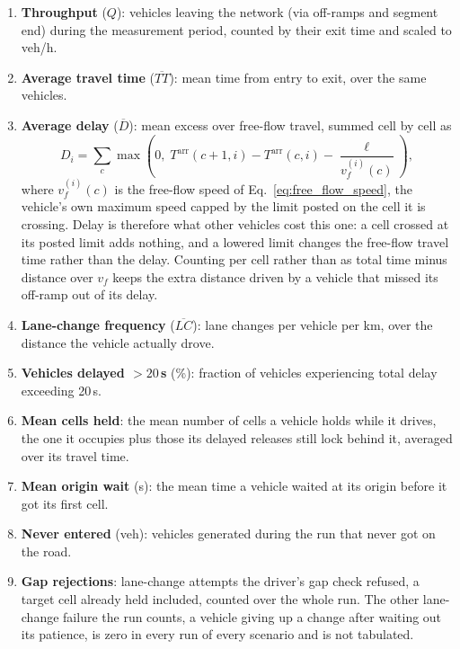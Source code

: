 \documentclass[review,authoryear]{elsarticle}
\newcommand{\Tarr}{T^{\text{arr}}}
\begin{document}
\begin{enumerate}
    \item \textbf{Throughput} ($Q$): vehicles leaving the network (via off-ramps and segment end) during the measurement period, counted by their exit time and scaled to veh/h.
    \item \textbf{Average travel time} ($\overline{TT}$): mean time from entry to exit, over the same vehicles.
    \item \textbf{Average delay} ($\overline{D}$): mean excess over free-flow travel, summed cell by cell as
    \begin{equation}
        D_i = \sum_{c} \max\!\left(0,\; \Tarr(c+1,i) - \Tarr(c,i) - \frac{\ell}{v_f^{(i)}(c)}\right),
        \label{eq:delay}
    \end{equation}
    where $v_f^{(i)}(c)$ is the free-flow speed of Eq.~\ref{eq:free_flow_speed}, the vehicle's own maximum speed capped by the limit posted on the cell it is crossing. Delay is therefore what other vehicles cost this one: a cell crossed at its posted limit adds nothing, and a lowered limit changes the free-flow travel time rather than the delay. Counting per cell rather than as total time minus distance over $v_f$ keeps the extra distance driven by a vehicle that missed its off-ramp out of its delay.
    \item \textbf{Lane-change frequency} ($\overline{LC}$): lane changes per vehicle per km, over the distance the vehicle actually drove.
    \item \textbf{Vehicles delayed $> 20$\,s} (\%): fraction of vehicles experiencing total delay exceeding 20\,s.
    \item \textbf{Mean cells held}: the mean number of cells a vehicle holds while it drives, the one it occupies plus those its delayed releases still lock behind it, averaged over its travel time.
    \item \textbf{Mean origin wait} (s): the mean time a vehicle waited at its origin before it got its first cell.
    \item \textbf{Never entered} (veh): vehicles generated during the run that never got on the road.
    \item \textbf{Gap rejections}: lane-change attempts the driver's gap check refused, a target cell already held included, counted over the whole run. The other lane-change failure the run counts, a vehicle giving up a change after waiting out its patience, is zero in every run of every scenario and is not tabulated.
\end{enumerate}
\end{document}
